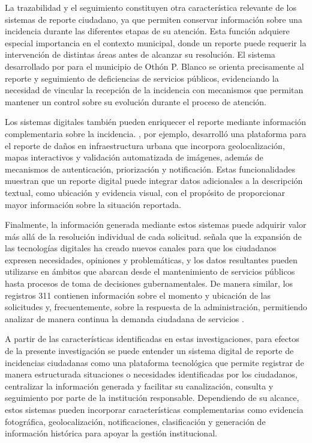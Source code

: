 La trazabilidad y el seguimiento constituyen otra característica relevante de los sistemas de reporte ciudadano, ya que permiten conservar información sobre una incidencia durante las diferentes etapas de su atención. Esta función adquiere especial importancia en el contexto municipal, donde un reporte puede requerir la intervención de distintas áreas antes de alcanzar su resolución. El sistema desarrollado por \cite{trejo2019sistema} para el municipio de Othón P. Blanco se orienta precisamente al reporte y seguimiento de deficiencias de servicios públicos, evidenciando la necesidad de vincular la recepción de la incidencia con mecanismos que permitan mantener un control sobre su evolución durante el proceso de atención.

Los sistemas digitales también pueden enriquecer el reporte mediante información complementaria sobre la incidencia. \cite{parrales2025desarrollo}, por ejemplo, desarrolló una plataforma para el reporte de daños en infraestructura urbana que incorpora geolocalización, mapas interactivos y validación automatizada de imágenes, además de mecanismos de autenticación, priorización y notificación. Estas funcionalidades muestran que un reporte digital puede integrar datos adicionales a la descripción textual, como ubicación y evidencia visual, con el propósito de proporcionar mayor información sobre la situación reportada.

Finalmente, la información generada mediante estos sistemas puede adquirir valor más allá de la resolución individual de cada solicitud. \cite{hubert2021herramientas} señala que la expansión de las tecnologías digitales ha creado nuevos canales para que los ciudadanos expresen necesidades, opiniones y problemáticas, y los datos resultantes pueden utilizarse en ámbitos que abarcan desde el mantenimiento de servicios públicos hasta procesos de toma de decisiones gubernamentales. De manera similar, los registros 311 contienen información sobre el momento y ubicación de las solicitudes y, frecuentemente, sobre la respuesta de la administración, permitiendo analizar de manera continua la demanda ciudadana de servicios \parencite{cook2024potholes}.

A partir de las características identificadas en estas investigaciones, para efectos de la presente investigación se puede entender un sistema digital de reporte de incidencias ciudadanas como una plataforma tecnológica que permite registrar de manera estructurada situaciones o necesidades identificadas por los ciudadanos, centralizar la información generada y facilitar su canalización, consulta y seguimiento por parte de la institución responsable. Dependiendo de su alcance, estos sistemas pueden incorporar características complementarias como evidencia fotográfica, geolocalización, notificaciones, clasificación y generación de información histórica para apoyar la gestión institucional.

